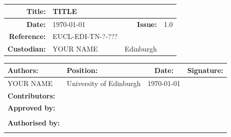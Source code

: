 \documentclass[11pt]{EuclidVIS}
\numberwithin{table}{section}
\numberwithin{figure}{section}
\begin{document}
\color{black}


\section*{}
\vspace{+0.2cm}
\noindent
\begin{tabularx}{1.0\textwidth}{ | r | X | r | l |}
\hline
\textbf{Title:} & TITLE & & \\
\hline
\textbf{Date:} & \today & \textbf{Issue:} & 1.0 \\
\hline
\textbf{Reference:} & EUCL-EDI-TN-?-??? & & \\
\hline
\textbf{Custodian:} & YOUR NAME & Edinburgh &\\
\hline
\end{tabularx}


\vspace{+4cm}
\noindent
\begin{tabularx}{1.0\textwidth}{ | l | X | c | l |}
\hline
\rowcolor{gray!30}
\textbf{Authors:} & \textbf{Position:} & \textbf{Date:} & \textbf{Signature:}\\
\hline
YOUR NAME & University of Edinburgh & \today & \\
\hline
\rowcolor{gray!30}
\textbf{Contributors:} & & & \\
\hline
\hline
\rowcolor{gray!30}
\textbf{Approved by:} & & &\\
\hline
&&&\\
\hline
\rowcolor{gray!30}
\textbf{Authorised by:} & & &\\
\hline
&&&\\
\hline
\end{tabularx}
\end{document}
